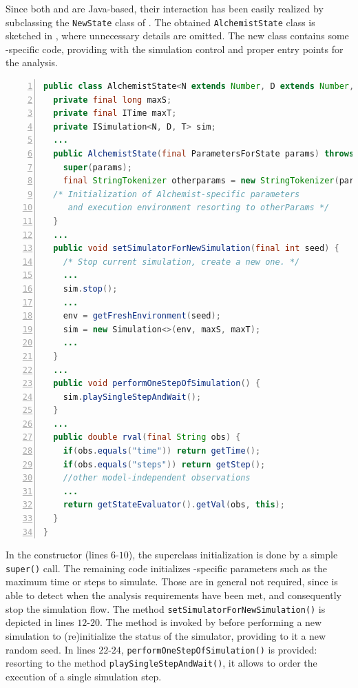 \documentclass[12pt,a4paper,twoside,openright]{book}
\begin{document}
Since both \multivesta{} and \alchemist{} are Java-based, their interaction has been easily realized by subclassing the \texttt{NewState} class of \multivesta{}.
%
The obtained \texttt{AlchemistState} class is sketched in , where unnecessary details are omitted.
The new class contains some \alchemist{}-specific code, providing \multivesta{} with the simulation control and proper entry points for the analysis.

\begin{lstlisting}[frame=single, basicstyle=\scriptsize, language=Java, mathescape, caption=AlchemistState extending \multivesta{}'s NewState class, label=lst:alchemiststate,float=t,numbers=left]
public class AlchemistState<N extends Number, D extends Number, T> extends NewState {
  private final long maxS; 
  private final ITime maxT;
  private ISimulation<N, D, T> sim;
  ...
  public AlchemistState(final ParametersForState params) throws ...{
    super(params);
    final StringTokenizer otherparams = new StringTokenizer(params.getOtherParameters());
  /* Initialization of Alchemist-specific parameters
     and execution environment resorting to otherParams */
  }
  ...
  public void setSimulatorForNewSimulation(final int seed) {
    /* Stop current simulation, create a new one. */
    ...
    sim.stop();
    ...
    env = getFreshEnvironment(seed);
    sim = new Simulation<>(env, maxS, maxT);
    ...
  }
  ...
  public void performOneStepOfSimulation() {
    sim.playSingleStepAndWait();
  }
  ...
  public double rval(final String obs) {
    if(obs.equals("time")) return getTime();
    if(obs.equals("steps")) return getStep();
    //other model-independent observations 
    ...
    return getStateEvaluator().getVal(obs, this);
  }
}
\end{lstlisting}

In the constructor (lines $6$-$10$), the superclass initialization is done by a simple \texttt{super()} call.
%
The remaining code initializes \alchemist{}-specific parameters such as the maximum time or steps to simulate.
%
Those  are in general not required, since \multivesta{} is able to detect when the analysis requirements have been met, and consequently stop the simulation flow.
%
The method \texttt{setSimulatorForNewSimulation()} is depicted in lines $12$-$20$.
%
The method is invoked by \multivesta{} before performing a new simulation to (re)initialize the status of the simulator, providing to it a new random seed. 
%
In lines $22$-$24$, \texttt{performOneStepOfSimulation()} is provided: resorting to the \alchemist{} method \texttt{playSingleStepAndWait()}, it allows \multivesta{} to order the execution of a single simulation step.
\end{document}
